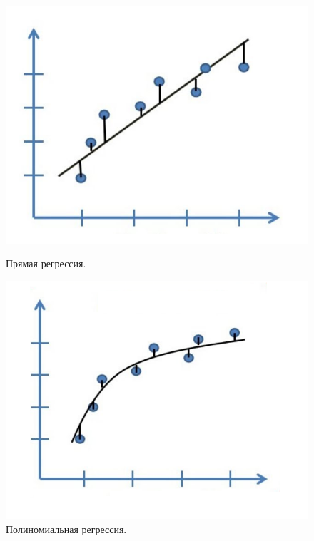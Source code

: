 \begin{enumerate}[label=\textbf{\arabic*.}, leftmargin=1.5em]
\begin{itemize}
\begin{itemize}
                              \begin{figure}[H]
                                  \begin{center}
                                      \begin{minipage}[h]{0.4\linewidth}
                                          \includegraphics[width=1\textwidth]{line.png}
                                          \caption{Прямая регрессия.}
                                          \label{ris:arc}
                                      \end{minipage}
                                      \hfill
                                      \begin{minipage}[H]{0.4\linewidth}
                                          \includegraphics[width=1\textwidth]{poly.png}
                                          \caption{Полиномиальная регрессия.}
                                          \label{ris:arc}
                                      \end{minipage}
                                  \end{center}
                              \end{figure}


\end{itemize}
\end{itemize}
\end{enumerate}
